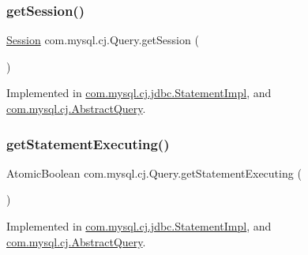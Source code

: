 \mbox{\label{interfacecom_1_1mysql_1_1cj_1_1_query_ad9657ad6282e8cccd264dccb9b1204a5}} 
\subsubsection{\texorpdfstring{get\+Session()}{getSession()}}
{\footnotesize\ttfamily \mbox{\hyperlink{interfacecom_1_1mysql_1_1cj_1_1_session}{Session}} com.\+mysql.\+cj.\+Query.\+get\+Session (\begin{DoxyParamCaption}{ }\end{DoxyParamCaption})}



Implemented in \mbox{\hyperlink{classcom_1_1mysql_1_1cj_1_1jdbc_1_1_statement_impl_a9ff54c722b7738065d93da540326ffad}{com.\+mysql.\+cj.\+jdbc.\+Statement\+Impl}}, and \mbox{\hyperlink{classcom_1_1mysql_1_1cj_1_1_abstract_query_a1a2b19defc25729698bb071e56ad2ef0}{com.\+mysql.\+cj.\+Abstract\+Query}}.

\mbox{\label{interfacecom_1_1mysql_1_1cj_1_1_query_a330ed617e56f62061a3a300128456dbb}} 
\subsubsection{\texorpdfstring{get\+Statement\+Executing()}{getStatementExecuting()}}
{\footnotesize\ttfamily Atomic\+Boolean com.\+mysql.\+cj.\+Query.\+get\+Statement\+Executing (\begin{DoxyParamCaption}{ }\end{DoxyParamCaption})}



Implemented in \mbox{\hyperlink{classcom_1_1mysql_1_1cj_1_1jdbc_1_1_statement_impl_ab253ad63963434ee5cde7ca8e68f7ff6}{com.\+mysql.\+cj.\+jdbc.\+Statement\+Impl}}, and \mbox{\hyperlink{classcom_1_1mysql_1_1cj_1_1_abstract_query_a1d16480e9a825e13d276fc18c90279cb}{com.\+mysql.\+cj.\+Abstract\+Query}}.

\mbox{\label{interfacecom_1_1mysql_1_1cj_1_1_query_a54f609a5c08b91fe0008e9b3334d0d82}} 
